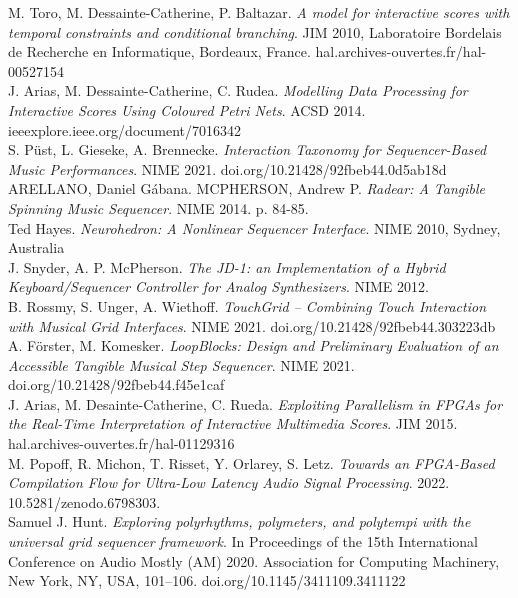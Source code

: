 \documentclass[journal,onecolumn]{IEEEtran}
\begin{document}
\begin{thebibliography}{1}
M. Toro, M. Dessainte-Catherine, P. Baltazar. \emph{A model for interactive scores with temporal constraints and conditional branching}. JIM 2010, Laboratoire Bordelais de Recherche en Informatique, Bordeaux, France. hal.archives-ouvertes.fr/hal-00527154 \\


J. Arias, M. Dessainte-Catherine, C. Rudea. \emph{Modelling Data Processing for Interactive Scores Using Coloured Petri Nets}. ACSD 2014. ieeexplore.ieee.org/document/7016342 \\

S. Püst, L. Gieseke, A. Brennecke. \emph{Interaction Taxonomy for Sequencer-Based Music Performances}. NIME 2021. doi.org/10.21428/92fbeb44.0d5ab18d \\

ARELLANO, Daniel Gábana. MCPHERSON, Andrew P. \emph{Radear: A Tangible Spinning Music Sequencer}. NIME 2014. p. 84-85. \\

Ted Hayes. \emph{Neurohedron: A Nonlinear Sequencer Interface}. NIME 2010, Sydney, Australia \\

J. Snyder, A. P. McPherson. \emph{The JD-1: an Implementation of a Hybrid Keyboard/Sequencer Controller for Analog Synthesizers}. NIME 2012. \\

B. Rossmy, S. Unger, A. Wiethoff. \emph{TouchGrid – Combining Touch Interaction with Musical Grid Interfaces}. NIME 2021. doi.org/10.21428/92fbeb44.303223db \\

A. Förster, M. Komesker. \emph{LoopBlocks: Design and Preliminary Evaluation of an Accessible Tangible Musical Step Sequencer}. NIME 2021. doi.org/10.21428/92fbeb44.f45e1caf \\

J. Arias, M. Desainte-Catherine, C. Rueda. \emph{Exploiting Parallelism in FPGAs for the Real-Time Interpretation of Interactive Multimedia Scores}. JIM 2015. hal.archives-ouvertes.fr/hal-01129316 \\

M. Popoff, R. Michon, T. Risset, Y. Orlarey, S. Letz. \emph{Towards an FPGA-Based Compilation Flow for Ultra-Low Latency Audio Signal Processing}. 2022. 10.5281/zenodo.6798303. \\

Samuel J. Hunt. \emph{Exploring polyrhythms, polymeters, and polytempi with the universal grid sequencer framework}. In Proceedings of the 15th International Conference on Audio Mostly (AM) 2020. Association for Computing Machinery, New York, NY, USA, 101–106. doi.org/10.1145/3411109.3411122 \\

\end{thebibliography}
\end{document}
